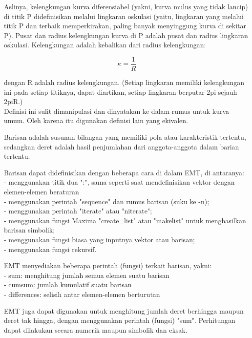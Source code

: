 \documentclass[a4paper,10pt]{article}
\begin{document}
\begin{eulernotebook}
\begin{eulercomment}
\begin{eulercomment}
\begin{eulercomment}
\begin{eulercomment}
\begin{eulercomment}
Aslinya, kelengkungan kurva diferensiabel (yakni, kurva mulus yang
tidak lancip) di titik P didefinisikan melalui lingkaran oskulasi
(yaitu, lingkaran yang melalui titik P dan terbaik memperkirakan,
paling banyak menyinggung kurva di sekitar P). Pusat dan radius
kelengkungan kurva di P adalah pusat dan radius lingkaran oskulasi.
Kelengkungan adalah kebalikan dari radius kelengkungan:

\end{eulercomment}
\begin{eulerformula}
\[
\kappa =\frac {1}{R}
\]
\end{eulerformula}
\begin{eulercomment}
dengan R adalah radius kelengkungan. (Setiap lingkaran memiliki
kelengkungan ini pada setiap titiknya, dapat diartikan, setiap
lingkaran berputar 2pi sejauh 2piR.)\\
Definisi ini sulit dimanipulasi dan dinyatakan ke dalam rumus untuk
kurva umum. Oleh karena itu digunakan definisi lain yang ekivalen.

\end{eulercomment}
\begin{eulercomment}
Barisan adalah susunan bilangan yang memiliki pola atau karakteristik
tertentu, sedangkan deret adalah hasil penjumlahan dari
anggota-anggota dalam barian tertentu.

Barisan dapat didefinisikan dengan beberapa cara di dalam EMT, di
antaranya:\\
- menggunakan titik dua ":", sama seperti saat mendefinisikan vektor
dengan elemen-elemen beraturan\\
- menggunakan perintah "sequence" dan rumus barisan (suku ke -n);\\
- menggunakan perintah "iterate" atau "niterate";\\
- menggunakan fungsi Maxima "create\_list" atau "makelist" untuk
menghasilkan barisan simbolik;\\
- menggunakan fungsi biasa yang inputnya vektor atau barisan;\\
- menggunakan fungsi rekursif.

EMT menyediakan beberapa perintah (fungsi) terkait barisan, yakni:\\
- sum: menghitung jumlah semua elemen suatu barisan\\
- cumsum: jumlah kumulatif suatu barisan\\
- differences: selisih antar elemen-elemen berturutan

EMT juga dapat digunakan untuk menghitung jumlah deret berhingga
maupun deret tak hingga, dengan menggunakan perintah (fungsi) "sum".
Perhitungan dapat dilakukan secara numerik maupun simbolik dan eksak.


\end{eulercomment}
\end{eulercomment}
\end{eulercomment}
\end{eulercomment}
\end{eulercomment}
\end{eulernotebook}
\end{document}
